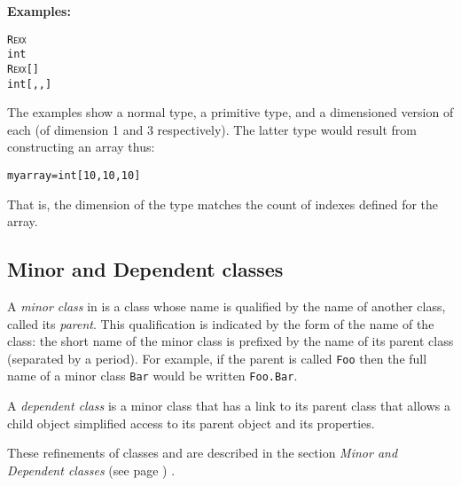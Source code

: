 \textbf{Examples:}
\begin{alltt}
R\textsc{exx}
int
R\textsc{exx}[]
int[,,]
\end{alltt}

The examples show a normal type, a primitive type, and a dimensioned
version of each (of dimension 1 and 3 respectively).  The latter type
would result from constructing an array thus:
\begin{alltt}
myarray=int[10,10,10]
\end{alltt}
That is, the dimension of the type matches the count of indexes
defined for the array.
\subsection{Minor and Dependent classes}\label{refmindep}
 
A \emph{minor class} in \nr{} is a class whose name is qualified by
the name of another class, called its \emph{parent}.
This qualification is indicated by the form of the name of the class:
the short name of the minor class is prefixed by the name of its parent
class (separated by a period).
For example, if the parent is called \texttt{Foo} then the full name of a
minor class \texttt{Bar} would be written \texttt{Foo.Bar}.
 
A \emph{dependent class} is a minor class that has a link to its
parent class that allows a child object simplified access to its
parent object and its properties.
 
These refinements of classes and are described in the
section  \emph{Minor and Dependent classes} (see page \pageref{refminor}) .
